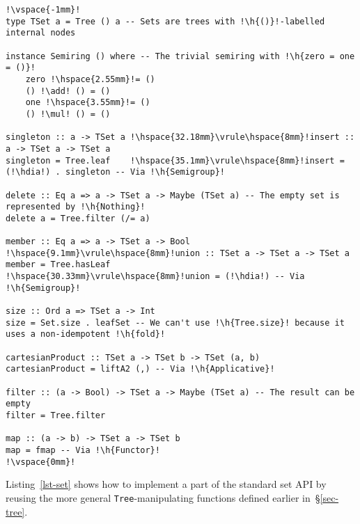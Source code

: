 \documentclass[crc,english]{programming}
\newcommand{\code}[1]{\lstinline[mathescape]|#1|}
\newcommand{\hcode}[1]{{\color{darkblue} \lstinline[keywordstyle={}]|#1|}} %
\newcommand{\h}[1]{{\itshape\color{grayblue}#1}} %
\newcommand{\hdia}{\,\text{\raisebox{-0.2mm}{\Large\color{darkblue} $\diamond$}}\,}
\newcommand{\add}{\text{\raisebox{-0.1mm}{\large $\oplus$}}}
\newcommand{\mul}{\text{\raisebox{-0.1mm}{\large $\otimes$}}}
\begin{document}
\begin{lstlisting}[label=lst-set,xleftmargin=0pt,belowskip=7pt,caption={
    Implementing a part of the standard \code{Data.S}\code{et} API with
    \hcode{TSet}.
},captionpos=t]
!\vspace{-1mm}!
type TSet a = Tree () a -- Sets are trees with !\h{()}!-labelled internal nodes

instance Semiring () where -- The trivial semiring with !\h{zero = one = ()}!
    zero !\hspace{2.55mm}!= ()
    () !\add! () = ()
    one !\hspace{3.55mm}!= ()
    () !\mul! () = ()

singleton :: a -> TSet a !\hspace{32.18mm}\vrule\hspace{8mm}!insert :: a -> TSet a -> TSet a
singleton = Tree.leaf    !\hspace{35.1mm}\vrule\hspace{8mm}!insert = (!\hdia!) . singleton -- Via !\h{Semigroup}!

delete :: Eq a => a -> TSet a -> Maybe (TSet a) -- The empty set is represented by !\h{Nothing}!
delete a = Tree.filter (/= a)

member :: Eq a => a -> TSet a -> Bool !\hspace{9.1mm}\vrule\hspace{8mm}!union :: TSet a -> TSet a -> TSet a
member = Tree.hasLeaf                 !\hspace{30.33mm}\vrule\hspace{8mm}!union = (!\hdia!) -- Via !\h{Semigroup}!

size :: Ord a => TSet a -> Int
size = Set.size . leafSet -- We can't use !\h{Tree.size}! because it uses a non-idempotent !\h{fold}!

cartesianProduct :: TSet a -> TSet b -> TSet (a, b)
cartesianProduct = liftA2 (,) -- Via !\h{Applicative}!

filter :: (a -> Bool) -> TSet a -> Maybe (TSet a) -- The result can be empty
filter = Tree.filter

map :: (a -> b) -> TSet a -> TSet b
map = fmap -- Via !\h{Functor}!
!\vspace{0mm}!
\end{lstlisting}

\noindent
Listing~\ref{lst-set} shows how to implement a part of the standard set API by
reusing the more general \hcode{Tree}-manipulating functions defined earlier
in~\S\ref{sec-tree}.
\end{document}
